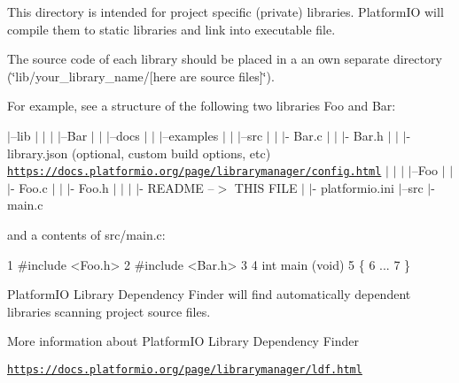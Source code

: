 This directory is intended for project specific (private) libraries. Platform\+IO will compile them to static libraries and link into executable file.

The source code of each library should be placed in a an own separate directory (\char`\"{}lib/your\+\_\+library\+\_\+name/\mbox{[}here are source files\mbox{]}\char`\"{}).

For example, see a structure of the following two libraries {\ttfamily Foo} and {\ttfamily Bar}\+:

$\vert$--lib $\vert$ $\vert$ $\vert$ $\vert$--Bar $\vert$ $\vert$ $\vert$--docs $\vert$ $\vert$ $\vert$--examples $\vert$ $\vert$ $\vert$--src $\vert$ $\vert$ $\vert$-\/ Bar.\+c $\vert$ $\vert$ $\vert$-\/ Bar.\+h $\vert$ $\vert$ $\vert$-\/ library.\+json (optional, custom build options, etc) \href{https://docs.platformio.org/page/librarymanager/config.html}{\tt https\+://docs.\+platformio.\+org/page/librarymanager/config.\+html} $\vert$ $\vert$ $\vert$ $\vert$--Foo $\vert$ $\vert$ $\vert$-\/ Foo.\+c $\vert$ $\vert$ $\vert$-\/ Foo.\+h $\vert$ $\vert$ $\vert$ $\vert$-\/ R\+E\+A\+D\+ME --$>$ T\+H\+IS F\+I\+LE $\vert$ $\vert$-\/ platformio.\+ini $\vert$--src $\vert$-\/ main.\+c

and a contents of {\ttfamily src/main.\+c}\+: 
\begin{DoxyCode}
1 #include <Foo.h>
2 #include <Bar.h>
3 
4 int main (void)
5 \{
6   ...
7 \}
\end{DoxyCode}


Platform\+IO Library Dependency Finder will find automatically dependent libraries scanning project source files.

More information about Platform\+IO Library Dependency Finder
\begin{DoxyItemize}
\item \href{https://docs.platformio.org/page/librarymanager/ldf.html}{\tt https\+://docs.\+platformio.\+org/page/librarymanager/ldf.\+html} 
\end{DoxyItemize}